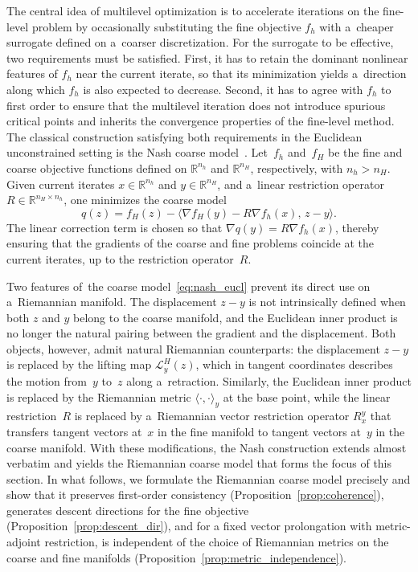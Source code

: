 \documentclass[11pt,reqno]{amsart}
\theoremstyle{plain}
\newcommand\R{\mathbb R}
\newcommand{\invRet}{\mathcal L}
\begin{document}
	The central idea of multilevel optimization is to accelerate iterations on the fine-level problem by occasionally substituting the fine objective $f_h$ with a~cheaper surrogate defined on a~coarser discretization. For the surrogate to be effective, two requirements must be satisfied. First, it has to retain the dominant nonlinear features of $f_h$ near the current iterate, so that its minimization yields a~direction along which $f_h$ is also expected to decrease. Second, it has to agree with $f_h$ to first order to ensure that the multilevel iteration does not introduce spurious critical points and inherits the convergence properties of the fine-level method. The classical construction satisfying both requirements in the Euclidean unconstrained setting is the Nash coarse model~\cite{Nash:2000}. Let~$f_h$ and~$f_H$ be the fine and coarse objective functions defined on $\R^{n_h}$ and $\R^{n_H}$, respectively, with $n_h>n_H$. Given current iterates $x \in \R^{n_h}$ and $y \in \R^{n_H}$, and a~linear restriction operator $R \in \R^{n_H \times n_h}$, one minimizes the coarse model
	\begin{equation}\label{eq:nash_eucl}
		q(z) = f_H(z) - \big\langle \nabla f_H(y) - R\nabla f_h(x),\, z - y \big\rangle.
	\end{equation}
	The linear correction term is chosen so that $\nabla q(y) = R\nabla f_h(x)$, thereby ensuring that the gradients of the coarse and fine problems coincide at the current iterates, up to the restriction operator~$R$.
	
	Two features of~the coarse model~\eqref{eq:nash_eucl} prevent its direct use on a~Riemannian manifold. The displacement $z - y$ is not intrinsically defined when both $z$ and $y$ belong to the coarse manifold, and the Euclidean inner product is no longer the natural pairing between the gradient and the displacement. Both objects, however, admit natural Riemannian counterparts: the displacement $z - y$ is replaced by the lifting  map $\invRet_y^H(z)$, which in tangent coordinates describes the motion from~$y$ to~$z$ along a~retraction. Similarly, the Euclidean inner product is replaced by the Riemannian metric $\langle \cdot, \cdot \rangle_y$ at the base point, while the linear restriction~$R$ is replaced by a~Riemannian vector restriction operator $R_x^y$ that transfers tangent vectors at~$x$ in the fine manifold to tangent vectors at~$y$ in the coarse manifold. With these modifications, the Nash construction extends almost verbatim and yields the Riemannian coarse model that forms the focus of this section. In what follows, we formulate the Riemannian coarse model precisely and show that it preserves first-order consistency (Proposition~\ref{prop:coherence}), generates descent directions for the fine objective (Proposition~\ref{prop:descent_dir}), and 
	for a fixed vector prolongation with metric-adjoint restriction, is independent of the choice of Riemannian metrics on the coarse and fine manifolds (Proposition~\ref{prop:metric_independence}).
	
\end{document}
